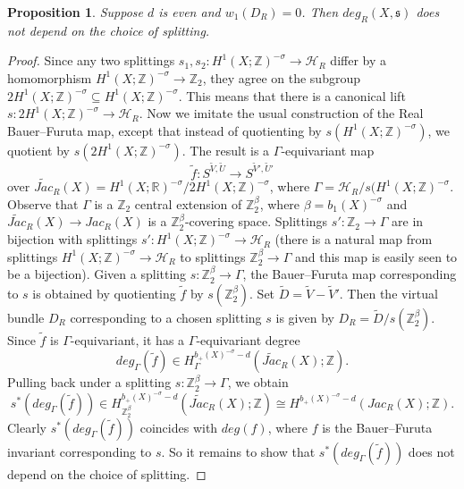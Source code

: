 \documentclass{amsart}
\newtheorem{proposition}[theorem]{Proposition}
\theoremstyle{definition}
\theoremstyle{remark}
\numberwithin{equation}{section}
\begin{document}
\begin{proposition}
Suppose $d$ is even and $w_1(D_R) = 0$. Then $deg_R(X,\mathfrak{s})$ does not depend on the choice of splitting.
\end{proposition}
\begin{proof}
Since any two splittings $s_1,s_2 : H^1(X ; \mathbb{Z})^{-\sigma} \to \mathcal{H}_R$ differ by a homomorphism $H^1(X ; \mathbb{Z})^{-\sigma} \to \mathbb{Z}_2$, they agree on the subgroup $2 H^1(X ; \mathbb{Z})^{-\sigma} \subseteq H^1(X ; \mathbb{Z})^{-\sigma}$. This means that there is a canonical lift $s : 2 H^1(X ; \mathbb{Z})^{-\sigma} \to \mathcal{H}_R$. Now we imitate the usual construction of the Real Bauer--Furuta map, except that instead of quotienting by $s(H^1(X ; \mathbb{Z})^{-\sigma})$, we quotient by $s(2H^1(X;\mathbb{Z})^{-\sigma})$. The result is a $\Gamma$-equivariant map 
\[
\widetilde{f} : S^{\widetilde{V} , \widetilde{U}} \to S^{\widetilde{V}' , \widetilde{U}'}
\]
over $\widetilde{Jac}_R(X) = H^1(X;\mathbb{R})^{-\sigma}/2H^1(X;\mathbb{Z})^{-\sigma}$, where $\Gamma = \mathcal{H}_R/s(H^1(X;\mathbb{Z})^{-\sigma}$. Observe that $\Gamma$ is a $\mathbb{Z}_2$ central extension of $\mathbb{Z}_2^{\beta}$, where $\beta = b_1(X)^{-\sigma}$ and $\widetilde{Jac}_R(X) \to Jac_R(X)$ is a $\mathbb{Z}_2^\beta$-covering space. Splittings $s' : \mathbb{Z}_2 \to \Gamma$ are in bijection with splittings $s' : H^1(X ; \mathbb{Z})^{-\sigma} \to \mathcal{H}_R$ (there is a natural map from splittings $H^1(X;\mathbb{Z})^{-\sigma} \to \mathcal{H}_R$ to splittings $\mathbb{Z}_2^\beta \to \Gamma$ and this map is easily seen to be a bijection). Given a splitting $s : \mathbb{Z}_2^\beta \to \Gamma$, the Bauer--Furuta map corresponding to $s$ is obtained by quotienting $\widetilde{f}$ by $s(\mathbb{Z}_2^\beta)$. Set $\widetilde{D} = \widetilde{V} - \widetilde{V}'$. Then the virtual bundle $D_R$ corresponding to a chosen splitting $s$ is given by $D_R = \widetilde{D}/s(\mathbb{Z}_2^\beta)$. Since $\widetilde{f}$ is $\Gamma$-equivariant, it has a $\Gamma$-equivariant degree
\[
deg_{\Gamma}( \widetilde{f} ) \in H^{b_+(X)^{-\sigma}-d}_\Gamma( \widetilde{Jac}_R(X) ; \mathbb{Z}).
\]
Pulling back under a splitting $s : \mathbb{Z}_2^\beta \to \Gamma$, we obtain
\[
s^*( deg_{\Gamma}(\widetilde{f})) \in H^{b_+(X)^{-\sigma}-d}_{\mathbb{Z}_2^\beta}( \widetilde{Jac}_R(X) ; \mathbb{Z}) \cong H^{b_+(X)^{-\sigma}-d}(Jac_R(X) ; \mathbb{Z}).
\]
Clearly $s^*(deg_{\Gamma}(\widetilde{f}))$ coincides with $deg(f)$, where $f$ is the Bauer--Furuta invariant corresponding to $s$. So it remains to show that $s^*( deg_{\Gamma}(\widetilde{f}))$ does not depend on the choice of splitting.


\end{proof}
\end{document}
